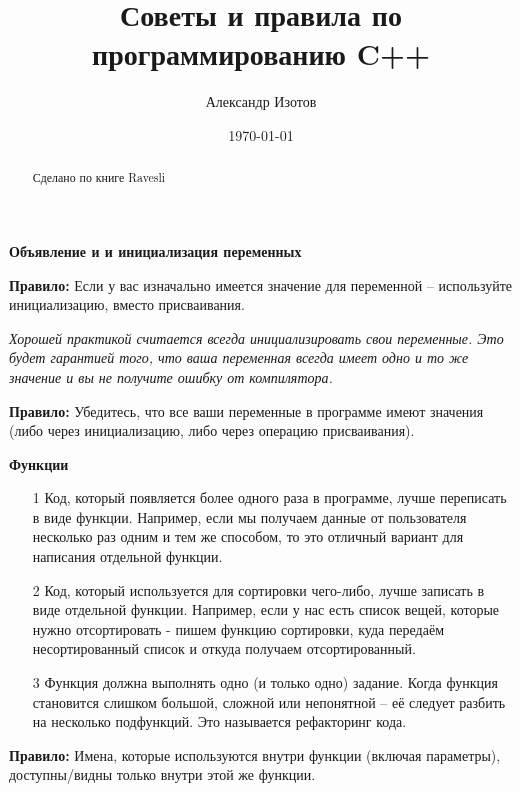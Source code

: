 \documentclass[a4paper,16pt]{report} %
\title{Советы и правила по программированию C++}
\date{\today} %
\author{Александр Изотов}
\begin{document}
	\maketitle %

\begin{abstract} %
Сделано по книге Ravesli
\end{abstract}
\begin{center}
	\large\textbf{Объявление и и инициализация переменных}
\end{center}

\textbf{Правило:} Если у вас изначально имеется значение для переменной – используйте инициализацию, вместо присваивания.

\textit{Хорошей практикой считается всегда инициализировать свои переменные. Это будет гарантией того, что ваша переменная всегда имеет одно и то же значение и вы не получите ошибку от компилятора.}

\textbf{Правило:} Убедитесь, что все ваши переменные в программе имеют значения (либо через инициализацию, либо через операцию присваивания).
\\
\begin{center}
	\large\textbf{Функции}
\end{center}

\begin{itemize}
	\item[1] Код, который появляется более одного раза в программе, лучше переписать в виде функции. Например, если мы получаем данные от пользователя несколько раз одним и тем же способом, то это отличный вариант для написания отдельной функции.
	\item[2] Код, который используется для сортировки чего-либо, лучше записать в виде отдельной функции. Например, если у нас есть список вещей, которые нужно отсортировать - пишем функцию сортировки, куда передаём несортированный список и откуда получаем отсортированный.
	\item[3] Функция должна выполнять одно (и только одно) задание.
	Когда функция становится слишком большой, сложной или непонятной – её следует разбить на несколько подфункций. Это называется рефакторинг кода.
\end{itemize}


\textbf{Правило:} Имена, которые используются внутри функции (включая
параметры), доступны/видны только внутри этой же функции.
\end{document}

